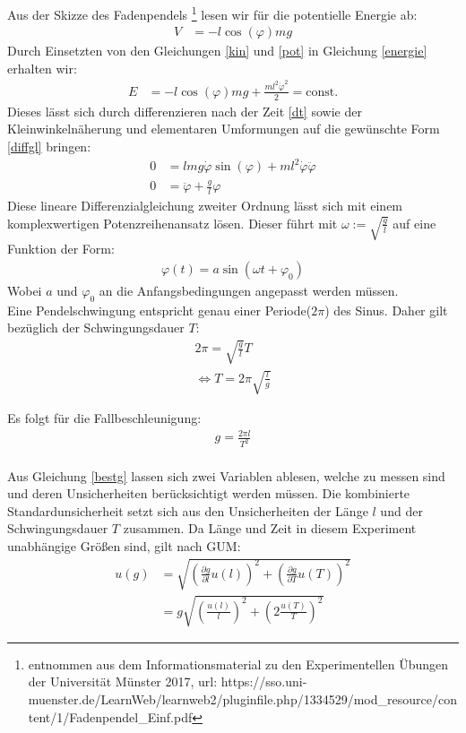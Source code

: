 Aus der Skizze des Fadenpendels \footnote{entnommen aus dem Informationsmaterial zu den Experimentellen Übungen der Universität Münster 2017, url: https://sso.uni-muenster.de/LearnWeb/learnweb2/pluginfile.php/1334529/mod\_resource/content/1/Fadenpendel\_Einf.pdf }  lesen wir für die potentielle Energie ab:
\begin{align}
V&=-l \cos (\varphi) m g
\label{pot}
\end{align}
Durch Einsetzten von den Gleichungen \cref{kin} und \cref{pot} in Gleichung \cref{energie} erhalten wir:
\begin{align}
E&=-l \cos (\varphi) m g +\frac{ml^2\dot{\varphi}^2}{2}=\textrm{const.}
\end{align}
Dieses lässt sich durch differenzieren nach der Zeit \cref{dt} sowie der Kleinwinkelnäherung und elementaren Umformungen auf die gewünschte Form \cref{diffgl} bringen:
\begin{align}
	0&=lmg \dot{\varphi}\sin (\varphi) +ml^2 \dot{\varphi} \ddot{\varphi}
	\label{dt} \\
	0&=\ddot{\varphi}+\frac{g}{l} \varphi
	\label{diffgl}
\end{align}
Diese lineare Differenzialgleichung zweiter Ordnung lässt sich mit einem komplexwertigen Potenzreihenansatz lösen. Dieser führt mit $\omega:=\sqrt{\frac{g}{l}}$ auf eine Funktion der Form: 
\begin{align}
\varphi(t)=a \sin (\omega t + \varphi_0)
\end{align}
Wobei $a$ und $\varphi_0$ an die Anfangsbedingungen angepasst werden müssen.\\
Eine Pendelschwingung entspricht genau einer Periode($2\pi$) des Sinus. Daher gilt bezüglich der Schwingungsdauer $T$:
\begin{align}
	2\pi = \sqrt{\frac{g}{l}} T \\
	\Leftrightarrow T= 2 \pi \sqrt{\frac{l}{g}}
\end{align}

Es folgt für die Fallbeschleunigung:
\begin{align}
g=\frac{2 \pi l}{T^2}
\label{bestg}
\end{align}\\



Aus Gleichung \ref{bestg} lassen sich zwei Variablen ablesen, welche zu messen sind und deren Unsicherheiten berücksichtigt werden müssen. Die kombinierte Standardunsicherheit setzt sich aus den Unsicherheiten der Länge $l$ und der Schwingungsdauer $T$ zusammen. Da Länge und Zeit in diesem Experiment unabhängige Größen sind, gilt nach GUM:
\begin{align}
u(g)&=\sqrt{\left(\frac{\partial g}{\partial l} u(l)\right)^2 + \left(\frac{\partial g}{\partial T}u(T)\right)^2 } \\
   &= g \sqrt{\left(\frac{u(l)}{l}\right)^2+ \left(2 \frac{ u(T)}{T}\right)^2 }
   \label{kombu}
\end{align}  





